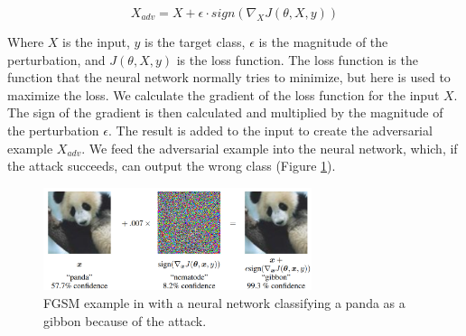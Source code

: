 \begin{equation}
    X_{adv} = X + \epsilon \cdot sign(\nabla_{X}J(\theta, X, y))
\end{equation}

Where $X$ is the input, $y$ is the target class, $\epsilon$ is the magnitude of the perturbation, and $J(\theta, X, y)$ is the loss function. The loss function is the function that the neural network normally tries to minimize, but here is used to maximize the loss. We calculate the gradient of the loss function for the input $X$. The sign of the gradient is then calculated and multiplied by the magnitude of the perturbation $\epsilon$. The result is added to the input to create the adversarial example $X_{adv}$. We feed the adversarial example into the neural network, which, if the attack succeeds, can output the wrong class (Figure \ref*{fig:fgsm}).

\begin{figure}[H]
    \centering
    \includegraphics[width=0.7\textwidth]{../Images/fgsm.png}
    \caption{FGSM example in \cite{goodfellow2015explaining} with a neural network classifying a panda as a gibbon because of the attack.}
    \label{fig:fgsm}
\end{figure}
